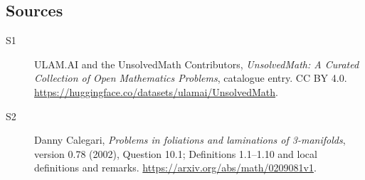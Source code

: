 \documentclass[11pt]{article}
\begin{document}
\subsection{Sources}
\begin{description}
\item[\hypertarget{source:statement:1}{S1}] ULAM.AI and the UnsolvedMath Contributors, \emph{UnsolvedMath: A Curated Collection of Open Mathematics Problems}, catalogue entry. CC BY 4.0. \url{https://huggingface.co/datasets/ulamai/UnsolvedMath}.
\item[\hypertarget{source:statement:2}{S2}] Danny Calegari, \emph{Problems in foliations and laminations of 3-manifolds}, version 0.78 (2002), Question 10.1; Definitions 1.1--1.10 and local definitions and remarks. \url{https://arxiv.org/abs/math/0209081v1}.
\end{description}
\label{end:statement}
\end{document}

